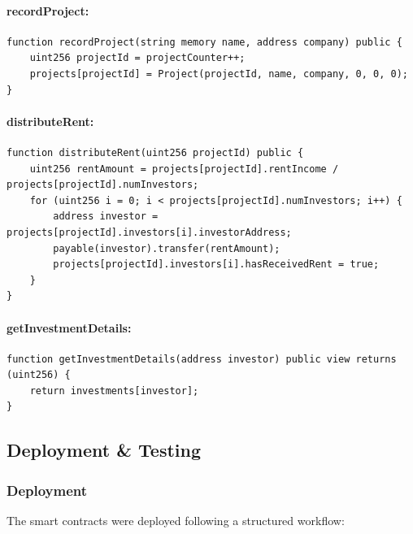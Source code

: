 \paragraph{recordProject:}
\begin{verbatim}
function recordProject(string memory name, address company) public {
    uint256 projectId = projectCounter++;
    projects[projectId] = Project(projectId, name, company, 0, 0, 0);
}
\end{verbatim}

\paragraph{distributeRent:}
\begin{verbatim}
function distributeRent(uint256 projectId) public {
    uint256 rentAmount = projects[projectId].rentIncome / projects[projectId].numInvestors;
    for (uint256 i = 0; i < projects[projectId].numInvestors; i++) {
        address investor = projects[projectId].investors[i].investorAddress;
        payable(investor).transfer(rentAmount);
        projects[projectId].investors[i].hasReceivedRent = true;
    }
}
\end{verbatim}

\paragraph{getInvestmentDetails:}
\begin{verbatim}
function getInvestmentDetails(address investor) public view returns (uint256) {
    return investments[investor];
}
\end{verbatim}

\subsection{Deployment \& Testing}

\subsubsection{Deployment}

The smart contracts were deployed following a structured workflow:

